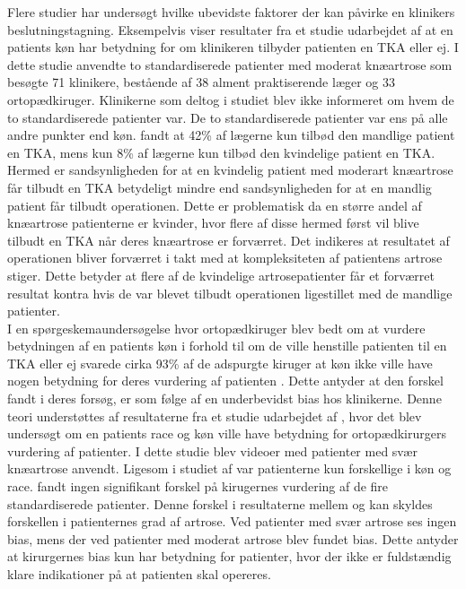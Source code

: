 Flere studier har undersøgt hvilke ubevidste faktorer der kan påvirke en klinikers beslutningstagning. Eksempelvis viser resultater fra et studie udarbejdet af \cite{borkhoff2008} at en patients køn har betydning for om klinikeren tilbyder patienten en TKA eller ej. I dette studie anvendte \cite{borkhoff2008} to standardiserede patienter med moderat knæartrose som besøgte 71 klinikere, bestående af 38 alment praktiserende læger og 33 ortopædkiruger. Klinikerne som deltog i studiet blev ikke informeret om hvem de to standardiserede patienter var. De to standardiserede patienter var ens på alle andre punkter end køn. \cite{borkhoff2008} fandt at 42\% af lægerne kun tilbød den mandlige patient en TKA, mens kun 8\% af lægerne kun tilbød den kvindelige patient en TKA. Hermed er sandsynligheden for at en kvindelig patient med moderart knæartrose får tilbudt en TKA betydeligt mindre end sandsynligheden for at en mandlig patient får tilbudt operationen. Dette er problematisk da en større andel af knæartrose patienterne er kvinder, hvor flere af disse hermed først vil blive tilbudt en TKA når deres knæartrose er forværret. Det indikeres at resultatet af operationen bliver forværret i takt med at kompleksiteten af patientens artrose stiger. \citep{fortin1999} Dette betyder at flere af de kvindelige artrosepatienter får et forværret resultat kontra hvis de var blevet tilbudt operationen ligestillet med de mandlige patienter. \citep{borkhoff2008} \\
I en spørgeskemaundersøgelse hvor ortopædkiruger blev bedt om at vurdere betydningen af en patients køn i forhold til om de ville henstille patienten til en TKA eller ej svarede cirka 93\% af de adspurgte kiruger at køn ikke ville have nogen betydning for deres vurdering af patienten \citep{wright1995}. Dette antyder at den forskel \cite{borkhoff2008} fandt i deres forsøg, er som følge af en underbevidst bias hos klinikerne. Denne teori understøttes af resultaterne fra et studie udarbejdet af \cite{dy2014}, hvor det blev undersøgt om en patients race og køn ville have betydning for ortopædkirurgers vurdering af patienter. I dette studie blev videoer med patienter med svær knæartrose anvendt. Ligesom i studiet af \cite{borkhoff2008} var patienterne kun forskellige i køn og race. \cite{dy2014} fandt ingen signifikant forskel på kirugernes vurdering af de fire standardiserede patienter. Denne forskel i resultaterne mellem \cite{borkhoff2008} og \cite{dy2014} kan skyldes forskellen i patienternes grad af artrose. Ved patienter med svær artrose ses ingen bias, mens der ved patienter med moderat artrose blev fundet bias. Dette antyder at kirurgernes bias kun har betydning for patienter, hvor der ikke er fuldstændig klare indikationer på at patienten skal opereres. \\
